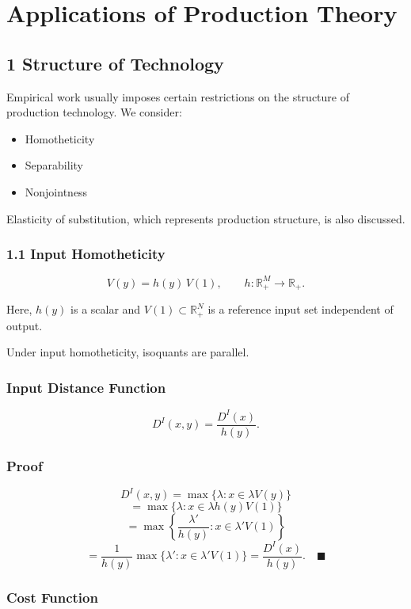 \chapter{Applications of  Production Theory}


\section{1 Structure of Technology}

Empirical work usually imposes certain restrictions on the structure
of production technology. We consider:

\begin{itemize}
    \item Homotheticity
    \item Separability
    \item Nonjointness
\end{itemize}

Elasticity of substitution, which represents production structure,
is also discussed.

\subsection*{1.1 Input Homotheticity}

\[
V(y)=h(y)\,V(1),
\qquad
h:\mathbb{R}_+^M \to \mathbb{R}_+.
\]

Here, $h(y)$ is a scalar and $V(1)\subset \mathbb{R}_+^N$
is a reference input set independent of output.

Under input homotheticity, isoquants are parallel.

\subsection*{Input Distance Function}

\[
D^I(x,y)=\frac{D^I(x)}{h(y)}.
\]

\subsection*{Proof}

\[
D^I(x,y)
=
\max \{\lambda : x \in \lambda V(y)\}
\]
\[
=
\max \{\lambda : x \in \lambda h(y)V(1)\}
\]
\[
=
\max \left\{ \frac{\lambda'}{h(y)} : x \in \lambda' V(1) \right\}
\]
\[
=
\frac{1}{h(y)} \max \{\lambda' : x \in \lambda' V(1)\}
=
\frac{D^I(x)}{h(y)}.
\quad \blacksquare
\]

\subsection*{Cost Function}

